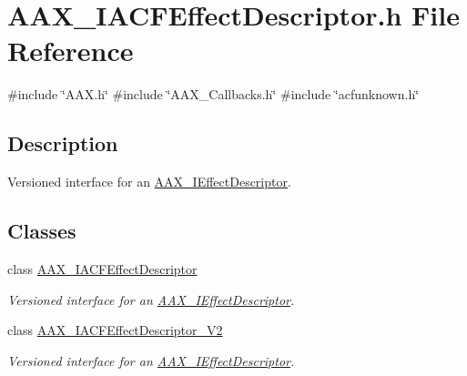 \hypertarget{a00521}{}\section{A\+A\+X\+\_\+\+I\+A\+C\+F\+Effect\+Descriptor.\+h File Reference}
\label{a00521}
{\ttfamily \#include \char`\"{}A\+A\+X.\+h\char`\"{}}\newline
{\ttfamily \#include \char`\"{}A\+A\+X\+\_\+\+Callbacks.\+h\char`\"{}}\newline
{\ttfamily \#include \char`\"{}acfunknown.\+h\char`\"{}}\newline


\subsection{Description}
Versioned interface for an \mbox{\hyperlink{a01813}{A\+A\+X\+\_\+\+I\+Effect\+Descriptor}}. 

\subsection*{Classes}
\begin{DoxyCompactItemize}
\item 
class \mbox{\hyperlink{a01653}{A\+A\+X\+\_\+\+I\+A\+C\+F\+Effect\+Descriptor}}
\begin{DoxyCompactList}\small\item\em Versioned interface for an \mbox{\hyperlink{a01813}{A\+A\+X\+\_\+\+I\+Effect\+Descriptor}}. \end{DoxyCompactList}\item 
class \mbox{\hyperlink{a01657}{A\+A\+X\+\_\+\+I\+A\+C\+F\+Effect\+Descriptor\+\_\+\+V2}}
\begin{DoxyCompactList}\small\item\em Versioned interface for an \mbox{\hyperlink{a01813}{A\+A\+X\+\_\+\+I\+Effect\+Descriptor}}. \end{DoxyCompactList}\end{DoxyCompactItemize}
